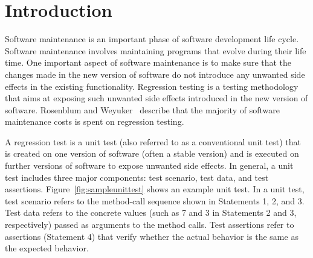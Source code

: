\section{Introduction}
\label{sec:intro}

Software maintenance is an important phase of software development 
life cycle. Software maintenance involves maintaining programs that 
evolve during their life time. One important aspect 
of software maintenance is to make sure that the changes made 
in the new version of software do not introduce any unwanted
side effects in the existing functionality. Regression testing is a testing 
methodology that aims at exposing such unwanted side effects introduced
in the new version of software. Rosenblum and Weyuker~\cite{rosenblum96:regression} describe
that the majority of software maintenance costs is spent on regression testing.

A regression test is a unit test (also referred to as a conventional unit test) that is created on one version of software 
(often a stable version) and is executed on further versions of software
to expose unwanted side effects. In general, a unit test includes three major components: test scenario, test data, and test
assertions. Figure~\ref{fig:sampleunittest} shows an example unit test.
In a unit test, test scenario refers to the method-call sequence shown in Statements
1, 2, and 3. Test data refers to the concrete values (such as 7 and 3
in Statements 2 and 3, respectively) passed as arguments to the method calls. 
Test assertions refer to assertions (Statement 4) that verify whether the actual
behavior is the same as the expected behavior.

